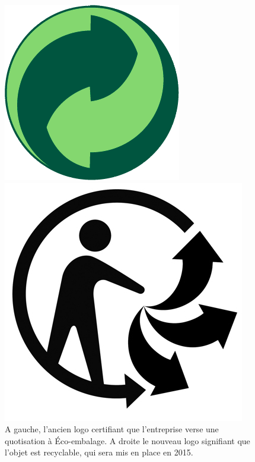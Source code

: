 \bigbreak

\begin{figure}[h]
\begin{minipage}{0.5\linewidth}
\begin{center}
\includegraphics[scale=0.3]{Rsc/ecoembalage.png} 
\end{center}
\end{minipage}
\begin{minipage}{0.5\linewidth}
\begin{center}
\includegraphics[scale=0.9]{Rsc/triman.jpg} 
\end{center}
\end{minipage}
\caption{\scriptsize{A gauche, l'ancien logo certifiant que l'entreprise verse une quotisation à Éco-embalage. A droite le nouveau logo signifiant que l'objet est recyclable, qui sera mis en place en 2015.}}
\end{figure}

